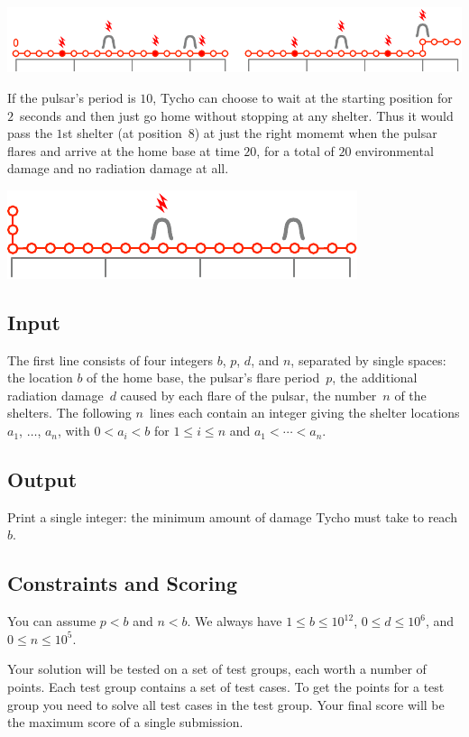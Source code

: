 \includegraphics[width=.8\textwidth]{img/sample1_2.pdf}

If the pulsar's period is $10$, Tycho can choose to wait at the starting position for $2$~seconds and then just go home without stopping at any shelter.
Thus it would pass the $1$st shelter (at position~$8$) at just the right momemt when the pulsar flares and arrive at the home base at time $20$, for a total of $20$ environmental damage and no radiation damage at all.

\includegraphics[width=.4\textwidth]{img/sample3.pdf}


\subsection*{Input}

The first line consists of four integers $b$, $p$, $d$, and $n$, separated by single spaces:
the location $b$ of the home base,
the pulsar's flare period~$p$,
the additional radiation damage~$d$ caused by each flare of the pulsar,
the number~$n$ of the shelters.
The following $n$~lines each contain an integer giving the shelter locations $a_1$, $\ldots$, $a_n$, with 
$0<a_i< b$ for $1\leq i \leq n$ %
and 
$a_1<\cdots <a_n$. %

\subsection*{Output}

Print a single integer: the minimum amount of damage Tycho must take to reach $b$.

\subsection*{Constraints and Scoring}

You can assume
$p < b$ %
and
$n < b$. %
We always have
$1\leq b\leq 10^{12}$, %
$0\leq d \leq 10^6$, %
and
$0\leq n \leq 10^5$. %

Your solution will be tested on a set of test groups, each worth a number of points.
Each test group contains a set of test cases.
To get the points for a test group you need to solve all test cases in the test group.
Your final score will be the maximum score of a single submission.

